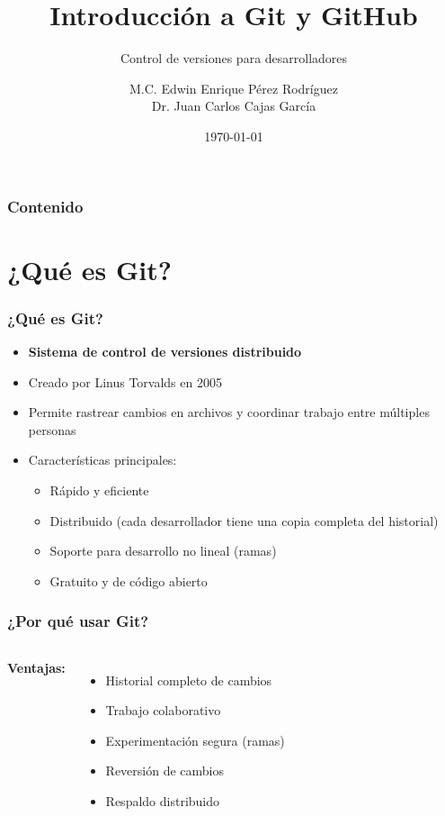 \documentclass[aspectratio=169]{beamer}
\title{Introducción a Git y GitHub}
\subtitle{Control de versiones para desarrolladores}
\author{M.C. Edwin Enrique Pérez Rodríguez \\ Dr. Juan Carlos Cajas García}
\institute{ENES Mérida}
\date{\today}
\begin{document}
\frame{\titlepage}

\begin{frame}
\frametitle{Contenido}
\tableofcontents
\end{frame}

\section{¿Qué es Git?}
\begin{frame}
\frametitle{¿Qué es Git?}
\begin{itemize}
    \item \textbf{Sistema de control de versiones distribuido}
    \item Creado por Linus Torvalds en 2005
    \item Permite rastrear cambios en archivos y coordinar trabajo entre múltiples personas
    \item Características principales:
    \begin{itemize}
        \item Rápido y eficiente
        \item Distribuido (cada desarrollador tiene una copia completa del historial)
        \item Soporte para desarrollo no lineal (ramas)
        \item Gratuito y de código abierto
    \end{itemize}
\end{itemize}
\end{frame}

\begin{frame}
\frametitle{¿Por qué usar Git?}
\begin{columns}
\textbf{Ventajas:}
\begin{itemize}
    \item Historial completo de cambios
    \item Trabajo colaborativo
    \item Experimentación segura (ramas)
    \item Reversión de cambios
    \item Respaldo distribuido
\end{itemize}

\begin{center}
\end{center}
\end{columns}
\end{frame}
\end{document}
